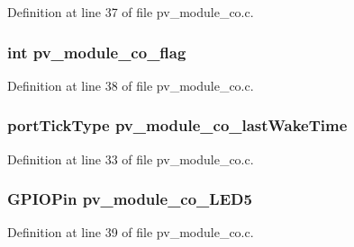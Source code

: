 Definition at line 37 of file pv\+\_\+module\+\_\+co.\+c.

\subsubsection[{\texorpdfstring{pv\+\_\+module\+\_\+co\+\_\+flag}{pv_module_co_flag}}]{\setlength{\rightskip}{0pt plus 5cm}int pv\+\_\+module\+\_\+co\+\_\+flag}\hypertarget{group__app__co_ga4e39239e9a359dfd174056754a046b8a}{}\label{group__app__co_ga4e39239e9a359dfd174056754a046b8a}


Definition at line 38 of file pv\+\_\+module\+\_\+co.\+c.

\subsubsection[{\texorpdfstring{pv\+\_\+module\+\_\+co\+\_\+last\+Wake\+Time}{pv_module_co_lastWakeTime}}]{\setlength{\rightskip}{0pt plus 5cm}port\+Tick\+Type pv\+\_\+module\+\_\+co\+\_\+last\+Wake\+Time}\hypertarget{group__app__co_gab06dc9c7b584f053bcde9e3dd366c886}{}\label{group__app__co_gab06dc9c7b584f053bcde9e3dd366c886}


Definition at line 33 of file pv\+\_\+module\+\_\+co.\+c.

\subsubsection[{\texorpdfstring{pv\+\_\+module\+\_\+co\+\_\+\+L\+E\+D5}{pv_module_co_LED5}}]{\setlength{\rightskip}{0pt plus 5cm}G\+P\+I\+O\+Pin pv\+\_\+module\+\_\+co\+\_\+\+L\+E\+D5}\hypertarget{group__app__co_gaa7d4da6aed3ca0087db45a3706ef17fa}{}\label{group__app__co_gaa7d4da6aed3ca0087db45a3706ef17fa}


Definition at line 39 of file pv\+\_\+module\+\_\+co.\+c.

